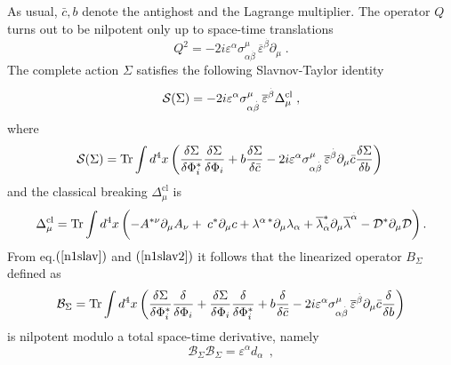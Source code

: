 \documentclass[a4paper,12pt]{article}
\begin{document}
As usual, $\bar{c},b$ denote the antighost and the Lagrange multiplier. The
operator $Q$ turns out to be nilpotent only up to space-time translations 
\begin{equation}
Q^{2}=-2i\varepsilon ^{\alpha }\sigma _{\alpha \stackrel{.}{\beta }}^{\mu }\,%
\overline{\varepsilon }^{\stackrel{.}{\beta }}\partial _{\mu }\;.
\label{q2n1}
\end{equation}
The complete action $\Sigma $ satisfies the following Slavnov-Taylor
identity 
\begin{equation}
\mathcal{S}(\Sigma )=-2i\varepsilon ^{\alpha }\sigma _{\alpha \stackrel{.}{%
\beta }}^{\mu }\,\overline{\varepsilon }^{\stackrel{.}{\beta }}\Delta _{\mu
}^{\mathrm{cl}}\;,  \label{n1slav}
\end{equation}
where 
\begin{equation}
\mathcal{S}(\Sigma )=\mathrm{Tr}\int d^{4}x\left( \frac{\delta \Sigma }{%
\delta \Phi _{i}^{*}}\frac{\delta \Sigma }{\delta \Phi _{i}}+b\frac{\delta
\Sigma }{\delta \bar{c}}-2i\varepsilon ^{\alpha }\sigma _{\alpha \stackrel{.%
}{\beta }}^{\mu }\,\overline{\varepsilon }^{\stackrel{.}{\beta }}\partial
_{\mu }\bar{c}\frac{\delta \Sigma }{\delta b}\right) \;  \label{n1slav2}
\end{equation}
and the classical breaking $\Delta _{\mu }^{\mathrm{cl}}$ is 
\begin{equation}
\Delta _{\mu }^{\mathrm{cl}}=\mathrm{Tr}\int d^{4}x\left( -A^{*\nu }\partial
_{\mu }A_{\nu }+\frac {} {}c^{*}\partial _{\mu }c+\lambda ^{\alpha
\,*}\partial _{\mu }\lambda _{\alpha }+\overline{\lambda }_{\stackrel{.}{%
\alpha }}^{*}\partial _{\mu }\overline{\lambda }^{\stackrel{.}{\alpha }}-%
\mathcal{D}^{*}\partial _{\mu }\mathcal{D}\right) .  \label{qcn1}
\end{equation}
From eq.$\left( \ref{n1slav}\right) $ and $\left( \ref{n1slav2}\right) $ it
follows that the linearized operator $B_{\Sigma }$ defined as 
\begin{equation}
\mathcal{B}_{\Sigma }=\mathrm{Tr}\int d^{4}x\left( \frac{\delta \Sigma }{%
\delta \Phi _{i}^{*}}\frac{\delta }{\delta \Phi _{i}}+\frac{\delta \Sigma }{%
\delta \Phi _{i}}\frac{\delta }{\delta \Phi _{i}^{*}}+b\frac{\delta }{\delta 
\bar{c}}-2i\varepsilon ^{\alpha }\sigma _{\alpha \stackrel{.}{\beta }}^{\mu
}\,\overline{\varepsilon }^{\stackrel{.}{\beta }}\partial _{\mu }\bar{c}%
\frac{\delta }{\delta b}\right) 
\end{equation}
is nilpotent modulo a total space-time derivative, namely 
\begin{equation}
\mathcal{B}_{\Sigma }\mathcal{B}_{\Sigma }=\varepsilon ^{\alpha }d_{\alpha
}\;\,,  \label{niln1}
\end{equation}
\end{document}
